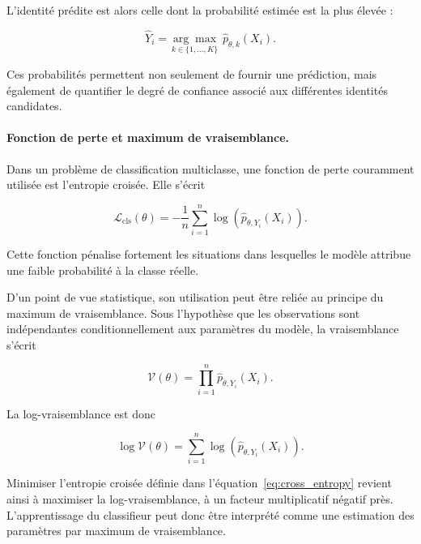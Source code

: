 \documentclass[11pt,a4paper]{report}
\begin{document}
L'identité prédite est alors celle dont la probabilité estimée est la plus
élevée :

\begin{equation}
    \widehat{Y}_i
    =
    \underset{k \in \{1,\ldots,K\}}{\arg\max}
    \;
    \widehat{p}_{\theta,k}(X_i).
\end{equation}

Ces probabilités permettent non seulement de fournir une prédiction, mais
également de quantifier le degré de confiance associé aux différentes identités
candidates.

\paragraph{Fonction de perte et maximum de vraisemblance.}

Dans un problème de classification multiclasse, une fonction de perte
couramment utilisée est l'entropie croisée. Elle s'écrit

\begin{equation}
    \mathcal{L}_{\mathrm{cls}}(\theta)
    =
    -\frac{1}{n}
    \sum_{i=1}^{n}
    \log
    \left(
        \widehat{p}_{\theta,Y_i}(X_i)
    \right).
    \label{eq:cross_entropy}
\end{equation}

Cette fonction pénalise fortement les situations dans lesquelles le modèle
attribue une faible probabilité à la classe réelle.

D'un point de vue statistique, son utilisation peut être reliée au principe du
maximum de vraisemblance. Sous l'hypothèse que les observations sont
indépendantes conditionnellement aux paramètres du modèle, la vraisemblance
s'écrit

\begin{equation}
    \mathcal{V}(\theta)
    =
    \prod_{i=1}^{n}
    \widehat{p}_{\theta,Y_i}(X_i).
\end{equation}

La log-vraisemblance est donc

\begin{equation}
    \log \mathcal{V}(\theta)
    =
    \sum_{i=1}^{n}
    \log
    \left(
        \widehat{p}_{\theta,Y_i}(X_i)
    \right).
\end{equation}

Minimiser l'entropie croisée définie dans
l'équation~\eqref{eq:cross_entropy} revient ainsi à maximiser la
log-vraisemblance, à un facteur multiplicatif négatif près. L'apprentissage
du classifieur peut donc être interprété comme une estimation des paramètres
par maximum de vraisemblance.
\end{document}
